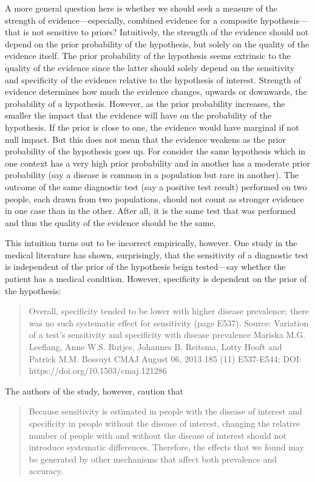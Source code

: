 \documentclass[10pt,dvipsnames,enabledeprecatedfontcommands]{scrartcl}
\begin{document}
A more general question here is whether we should seek a measure of the
strength of evidence---especially, combined evidence for a composite
hypothesis---that is not sensitive to priors? Intuitively, the strength
of the evidence should not depend on the prior probability of the
hypothesis, but solely on the quality of the evidence itself. The prior
probability of the hypothesis seems extrinsic to the quality of the
evidence since the latter should solely depend on the sensitivity and
specificity of the evidence relative to the hypothesis of interest.
Strength of evidence determines how much the evidence changes, upwards
or downwards, the probability of a hypothesis. However, as the prior
probability increases, the smaller the impact that the evidence will
have on the probability of the hypothesis. If the prior is close to one,
the evidence would have marginal if not null impact. But this does not
mean that the evidence weakens as the prior probability of the
hypothesis goes up. For consider the same hypothesis which in one
context has a very high prior probability and in another has a moderate
prior probability (say a disease is common in a population but rare in
another). The outcome of the same diagnostic test (say a positive test
result) performed on two people, each drawn from two populations, should
not count as stronger evidence in one case than in the other. After all,
it is the same test that was performed and thus the quality of the
evidence should be the same.

This intuition turns out to be incorrect empirically, however. One study
in the medical literature has shown, surprisingly, that the sensitivity
of a diagnostic test is independent of the prior of the hypothesis beign
tested---say whether the patient has a medical condition. However,
specificity is dependent on the prior of the hypothesis:

\begin{quote}
Overall, specificity tended to be
lower with higher disease prevalence; there
was no such systematic effect for sensitivity (page E537).
Source: Variation of a test’s sensitivity and specificity with disease prevalence Mariska M.G. Leeflang, Anne W.S. Rutjes, Johannes B. Reitsma, Lotty Hooft and Patrick M.M. Bossuyt
CMAJ August 06, 2013 185 (11) E537-E544; DOI: https://doi.org/10.1503/cmaj.121286
\end{quote}

\noindent The authors of the study, however, caution that

\begin{quote}
 Because sensitivity is estimated in
people with the disease of interest and specificity
in people without the disease of interest, changing the relative number of people 
with and without the disease of interest should not introduce
systematic differences. Therefore, the effects that
we found may be generated by other mechanisms that affect 
both prevalence and accuracy.
\end{quote}
\end{document}
